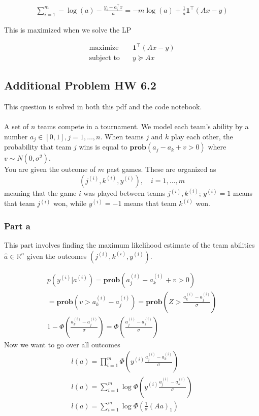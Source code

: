 \begin{gather}
    \sum_{i=1}^m -\log (a) -\frac{y_i - a_i^\top x}{a} = -m \log(a) + \frac{1}{a}\textbf{1}^\top(Ax -y) 
\end{gather}

This is maximized when we solve the LP

\begin{align}
  \text{maximize} & \quad \textbf{1}^\top (Ax-y) \\
  \text{subject to} & \quad y \succeq Ax
\end{align}

\subsection{Additional Problem HW 6.2}
This question is solved in both this pdf and the code notebook.
\\ \\
A set of $n$ teams compete in a tournament. We model each team's ability by a number $a_j \in [0,1], j = 1, \dots, n$. When teams $j$ and $k$ play each other, the probability that team $j$ wins is equal to $\textbf{prob}(a_j - a_k + v > 0)$ where $v \sim N(0, \sigma^2)$. \\
You are given the outcome of $m$ past games. These are organized as
\begin{equation}
    (j^{(i)}, k^{(i)}, y^{(i)}), \quad i = 1, \dots, m
\end{equation}
meaning that the game $i$ was played between teams $j^{(i)}, k^{(i)}$; $y^{(i)}=1$ means that team $j^{(i)}$ won, while $y^{(i)}=-1$ means that team $k^{(i)}$ won.
\subsubsection{Part a}
This part involves finding the maximum likelihood estimate of the team abilities $\hat{a} \in \mathbb{R}^n$ given the outcomes  $(j^{(i)}, k^{(i)}, y^{(i)})$.

\begin{gather}
    p(y^{(i)} | a^{(i)}) = \textbf{prob} (a_j^{(i)} - a_k^{(i)} + v > 0) \\
    = \textbf{prob} (v > a_k^{(i)} - a_j^{(i)}) =  \textbf{prob} (Z > \frac{a_k^{(i)} - a_j^{(i)}}{\sigma}) \\
    1 - \Phi (\frac{a_k^{(i)} - a_j^{(i)}}{\sigma}) = \Phi (\frac{a_j^{(i)} - a_k^{(i)}}{\sigma})
\end{gather}
Now we  want to go over all outcomes
\begin{gather}
    l(a) = \prod_{i=1}^{m} \Phi (y^{(i)}\frac{a_j^{(i)} - a_k^{(i)}}{\sigma}) \\
    l(a) = \sum_{i=1}^{m} \log \Phi (y^{(i)}\frac{a_j^{(i)} - a_k^{(i)}}{\sigma}) \\
    l(a) = \sum_{i=1}^{m} \log \Phi (\frac{1}{\sigma} (Aa)_1)
\end{gather}

